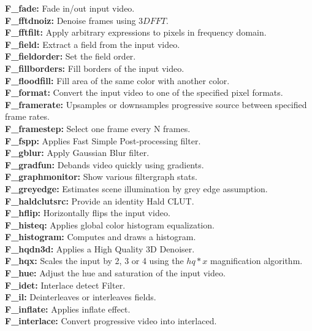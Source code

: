 \textbf{F\_fade:} Fade in/out input video.\\
\textbf{F\_fftdnoiz:} Denoise frames using $3D FFT$.\\
\textbf{F\_fftfilt:} Apply arbitrary expressions to pixels in frequency domain.\\
\textbf{F\_field:} Extract a field from the input video.\\
\textbf{F\_fieldorder:} Set the field order.\\
\textbf{F\_fillborders:} Fill borders of the input video.\\
\textbf{F\_floodfill:} Fill area of the same color with another color.\\
\textbf{F\_format:} Convert the input video to one of the specified pixel formats.\\
\textbf{F\_framerate:} Upsamples or downsamples progressive source between specified frame rates.\\
\textbf{F\_framestep:} Select one frame every N frames.\\
\textbf{F\_fspp:} Applies Fast Simple Post-processing filter.\\
\textbf{F\_gblur:} Apply Gaussian Blur filter.\\
\textbf{F\_gradfun:} Debands video quickly using gradients.\\
\textbf{F\_graphmonitor:} Show various filtergraph stats.\\
\textbf{F\_greyedge:} Estimates scene illumination by grey edge assumption.\\
\textbf{F\_haldclutsrc:} Provide an identity Hald CLUT.\\
\textbf{F\_hflip:} Horizontally flips the input video.\\
\textbf{F\_histeq:} Applies global color histogram equalization.\\
\textbf{F\_histogram:} Computes and draws a histogram.\\
\textbf{F\_hqdn3d:} Applies a High Quality 3D Denoiser.\\
\textbf{F\_hqx:} Scales the input by 2, 3 or 4 using the $hq*x$ magnification algorithm.\\
\textbf{F\_hue:} Adjust the hue and saturation of the input video.\\
\textbf{F\_idet:} Interlace detect Filter.\\
\textbf{F\_il:} Deinterleaves or interleaves fields.\\
\textbf{F\_inflate:} Applies inflate effect.\\
\textbf{F\_interlace:} Convert progressive video into interlaced.\\
